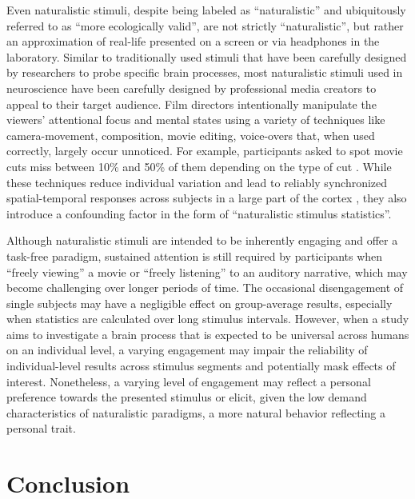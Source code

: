 %
Even naturalistic stimuli, despite being labeled as ``naturalistic''
and ubiquitously referred to as ``more ecologically valid'', are not strictly
``naturalistic'', but rather an approximation of real-life presented on a screen
or via headphones in the laboratory.
Similar to traditionally used stimuli that have been carefully designed by
researchers to probe specific brain processes, most naturalistic stimuli used in
neuroscience have been carefully designed by professional media creators to
appeal to their target audience.
%
Film directors intentionally manipulate the viewers' attentional focus and
mental states using a variety of techniques like camera-movement, composition,
movie editing, voice-overs \citep{brown2012cinematography,
dancyger2011film-technique, katz1991film, mercado2011filmmakers} that, when used
correctly, largely occur unnoticed.
%
For example, participants asked to spot movie cuts miss between 10\% and 50\% of
them depending on the type of cut \citep{smith2008edit}.
%
While these techniques reduce individual variation and lead to reliably
synchronized spatial-temporal responses across subjects in a large part of the
cortex \citep{hasson2008neurocinematics}, they also introduce a confounding
factor in the form of ``naturalistic stimulus statistics''.

%
Although naturalistic stimuli are intended to be inherently engaging and offer a
task-free paradigm, sustained attention is still required by participants when
``freely viewing'' a movie or ``freely listening'' to an auditory narrative,
which may become challenging over longer periods of time.
%
The occasional disengagement of single subjects may have a negligible effect on
group-average results, especially when statistics are calculated over long
stimulus intervals.
%
However, when a study aims to investigate a brain process that is expected to be
universal across humans on an individual level, a varying engagement may impair
the reliability of individual-level results across stimulus segments and
potentially mask effects of interest.
%
Nonetheless, a varying level of engagement may reflect a personal preference
towards the presented stimulus or elicit, given the low demand characteristics
\citep[cf.][]{orne1962social} of naturalistic paradigms, a more natural behavior
reflecting a personal trait.



\section{Conclusion}


